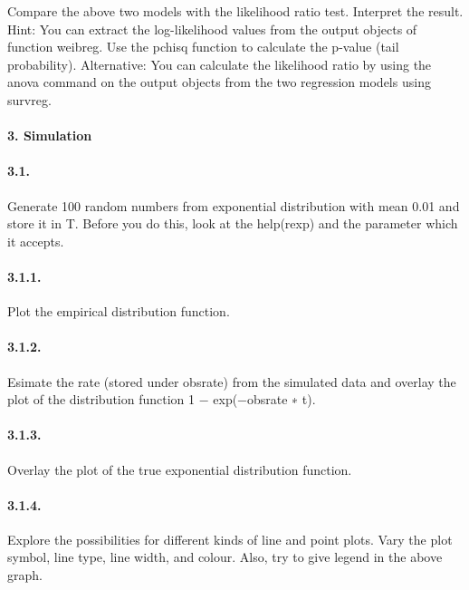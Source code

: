 \documentclass[]{article}
\let\oldparagraph\paragraph
\renewcommand{\paragraph}[1]{\oldparagraph{#1}\mbox{}}
\begin{document}
Compare the above two models with the likelihood ratio test. Interpret
the result. Hint: You can extract the log-likelihood values from the
output objects of function weibreg. Use the pchisq function to calculate
the p-value (tail probability). Alternative: You can calculate the
likelihood ratio by using the anova command on the output objects from
the two regression models using survreg.

\paragraph{3. Simulation}\label{simulation}

\paragraph{3.1.}\label{section-6}

Generate 100 random numbers from exponential distribution with mean 0.01
and store it in T. Before you do this, look at the help(rexp) and the
parameter which it accepts.

\paragraph{3.1.1.}\label{section-7}

Plot the empirical distribution function.

\paragraph{3.1.2.}\label{section-8}

Esimate the rate (stored under obsrate) from the simulated data and
overlay the plot of the distribution function 1 − exp(−obsrate ∗ t).

\paragraph{3.1.3.}\label{section-9}

Overlay the plot of the true exponential distribution function.

\paragraph{3.1.4.}\label{section-10}

Explore the possibilities for different kinds of line and point plots.
Vary the plot symbol, line type, line width, and colour. Also, try to
give legend in the above graph.
\end{document}
